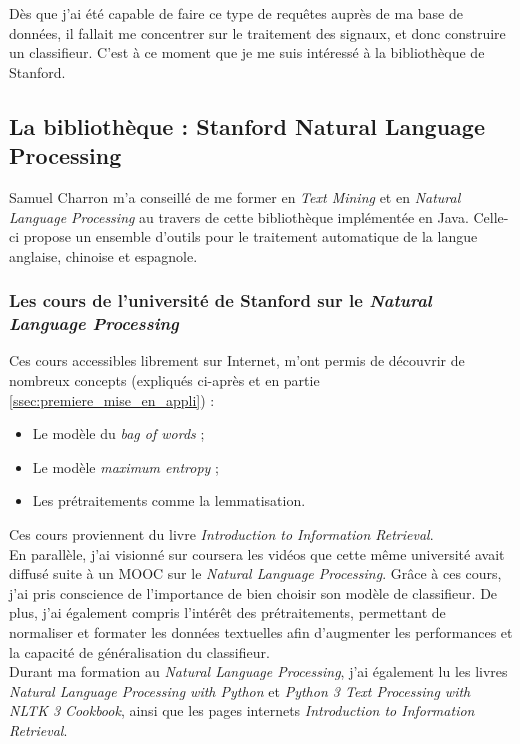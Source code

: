         Dès que j'ai été capable de faire ce type de requêtes auprès de ma base de données, il fallait me concentrer sur le traitement des signaux, et donc construire un classifieur. C'est à ce moment que je me suis intéressé à la bibliothèque de Stanford.

        \subsection{La bibliothèque : Stanford Natural Language Processing}
            Samuel Charron m'a conseillé de me former en \textit{Text Mining} et en \textit{Natural Language Processing} au travers de cette bibliothèque implémentée en Java. Celle-ci propose un ensemble d'outils pour le traitement automatique de la langue anglaise, chinoise et espagnole.

            \subsubsection{Les cours de l'université de Stanford sur le \textit{Natural Language Processing}}
                Ces cours accessibles librement sur Internet, m'ont permis de découvrir de nombreux concepts (expliqués ci-après et en partie \ref{ssec:premiere_mise_en_appli}) :
                \begin{itemize}
                    \item Le modèle du \textit{bag of words} ;
                    \item Le modèle \textit{maximum entropy} ;
                    \item Les prétraitements comme la lemmatisation.
                \end{itemize}
                Ces cours proviennent du livre \textit{Introduction to Information Retrieval}\autocite{ir_web}.\\

                En parallèle, j'ai visionné sur coursera les vidéos que cette même université avait diffusé suite à un MOOC sur le \textit{Natural Language Processing}. Grâce à ces cours, j'ai pris conscience de l'importance de bien choisir son modèle de classifieur. De plus, j'ai également compris l'intérêt des prétraitements, permettant de normaliser et formater les données textuelles afin d'augmenter les performances et la capacité de généralisation du classifieur.\\

                Durant ma formation au \textit{Natural Language Processing}, j'ai également lu les livres \textit{Natural Language Processing with Python}\autocite{nlp_p} et \textit{Python 3 Text Processing with NLTK 3 Cookbook}\autocite{nltk}, ainsi que les pages internets \textit{Introduction to Information Retrieval}\autocite{ir_web}.

